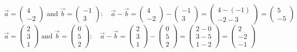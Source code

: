 \documentclass[12pt,eng]{skript_ogg}
\begin{document}
\begin{beispiel} 
\[\vec{a}=\begin{pmatrix}4\\-2\end{pmatrix}\text{ and }\vec{b}=\begin{pmatrix}-1\\3\end{pmatrix}:\quad\vec{a}-\vec{b}=\begin{pmatrix}4\\-2\end{pmatrix}-\begin{pmatrix}-1\\3\end{pmatrix}=\begin{pmatrix}4-(-1)\\-2-3\end{pmatrix}=\begin{pmatrix}5\\-5\end{pmatrix}\]
\[\vec{a}=\begin{pmatrix}2\\3\\1\end{pmatrix}\text{ and }\vec{b}=\begin{pmatrix}0\\5\\2\end{pmatrix}:\quad\vec{a}-\vec{b}=\begin{pmatrix}2\\3\\1\end{pmatrix}-\begin{pmatrix}0\\5\\2\end{pmatrix}=\begin{pmatrix}2-0\\3-5\\1-2\end{pmatrix}=\begin{pmatrix}2\\-2\\-1\end{pmatrix}\]
\end{beispiel}
\end{document}
